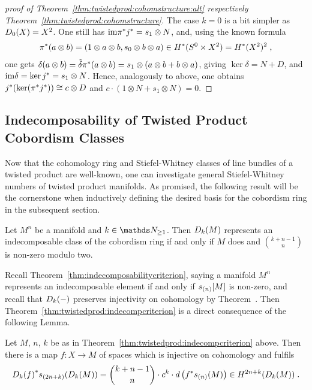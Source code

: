 \begin{proof}[proof of
  Theorem~\ref{thm:twistedprod:cohomstructure:alt}
  respectively Theorem~\ref{thm:twistedprod:cohomstructure}]
  The case $k=0$ is a bit simpler as
  $D_{0}({X})=X^2$. One still has
  $\mathrm{im}{\pi}^*{j}^*=s_1\otimes N$, and, using the known formula
  \begin{gather*}
    {\pi}^*(a\otimes b)=(1\otimes a\otimes b, s_0\otimes b\otimes a)
    \in H^*(S^0\times X^2)=H^*(X^2)^2
    \;,
  \end{gather*}
  one gets
  $\delta(a\otimes b)
  = \tilde\delta{\pi}^*(a\otimes b)
  = s_1\otimes(a\otimes b + b\otimes a)$, giving
  $\ker\delta=N+D$, and $\mathrm{im}\delta = \ker{j}^* = s_1\otimes N$.
  Hence, analogously to above, one obtains
  ${j}^* (\ker({\pi}^*{j}^*)) \cong c\otimes D$ and
  $c\cdot (1\otimes N + s_1\otimes N) = 0$.
\end{proof}


\subsection{Indecomposability of Twisted Product Cobordism Classes}
\label{sec:twistedprod:indecompcriterion}
Now that the cohomology ring and Stiefel-Whitney classes of line
bundles of a twisted product are well-known, one can investigate
general Stiefel-Whitney numbers of twisted product manifolds.
As promised, the following result will be the cornerstone when inductively
defining the desired basis for the cobordism ring in the subsequent section.
\begin{Thm}\label{thm:twistedprod:indecompcriterion}
  Let $M^n$ be a manifold and $k\in\Nat_{\geq1}$.
  Then $D_{k}({M})$ represents an indecomposable class of the
  cobordism ring if and only if $M$ does and $\binom{k+n-1}{n}$ is
  non-zero modulo two.
\end{Thm}
Recall Theorem~\ref{thm:indecomposabilitycriterion}, saying
a manifold $M^n$ represents an indecomposable element if and only if
$s_{(n)}[M]$ is non-zero,
and recall that $D_{k}({-})$ preserves injectivity on
cohomology by
Theorem~.
Then Theorem~\ref{thm:twistedprod:indecompcriterion} is a
direct consequence of the following Lemma.
\begin{Lem}\label{lem:twistedprod:indecompcriterion}
  Let $M$, $n$, $k$ be as in
  Theorem~\ref{thm:twistedprod:indecompcriterion} above.
  Then there is a map $f\colon X\to M$ of spaces which is injective on
  cohomology and fulfils
  \begin{gather*}
    {D_{k}({f})}^* s_{(2n+k)}(D_{k}({M}))
    = \binom{k+n-1}{n} \cdot c^k
    \cdot d\left( {f}^* s_{(n)}(M) \right)
    \in H^{2n+k}(D_{k}({M}))
    \;.
  \end{gather*}
\end{Lem}
